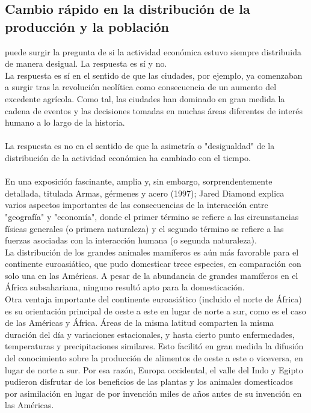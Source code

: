 \begin{multicols}{2}
\section{Cambio rápido en la distribución de la producción y la población}
    puede surgir la pregunta de si la actividad económica estuvo siempre distribuida de manera desigual. La respuesta es sí y no.\\
    La respuesta es sí en el sentido de que las ciudades, por ejemplo, ya comenzaban a surgir tras la revolución neolítica como consecuencia de un aumento del excedente agrícola. Como tal, las ciudades han dominado en gran medida la cadena de eventos y las decisiones tomadas en muchas áreas diferentes de interés humano a lo largo de la historia.\\\\
    La respuesta es no en el sentido de que la asimetría o "desigualdad" de la distribución de la actividad económica ha cambiado con el tiempo.\\\\
    En una exposición fascinante, amplia y, sin embargo, sorprendentemente detallada, titulada Armas, gérmenes y acero (1997); Jared Diamond explica varios aspectos importantes de las consecuencias de la interacción entre "geografía" y "economía", donde el primer término se refiere a las circunstancias físicas generales (o primera naturaleza) y el segundo término se refiere a las fuerzas asociadas con la interacción humana (o segunda naturaleza).\\
    La distribución de los grandes animales mamíferos es aún más favorable para el continente euroasiático, que pudo domesticar trece especies, en comparación con solo una en las Américas. A pesar de la abundancia de grandes mamíferos en el África subsahariana, ninguno resultó apto para la domesticación.\\
    Otra ventaja importante del continente euroasiático (incluido el norte de África) es su orientación principal de oeste a este en lugar de norte a sur, como es el caso de las Américas y África. Áreas de la misma latitud comparten la misma duración del día y variaciones estacionales, y hasta cierto punto enfermedades, temperaturas y precipitaciones similares. Esto facilitó en gran medida la difusión del conocimiento sobre la producción de alimentos de oeste a este o viceversa, en lugar de norte a sur. Por esa razón, Europa occidental, el valle del Indo y Egipto pudieron disfrutar de los beneficios de las plantas y los animales domesticados por asimilación en lugar de por invención miles de años antes de su invención en las Américas.


\end{multicols}
